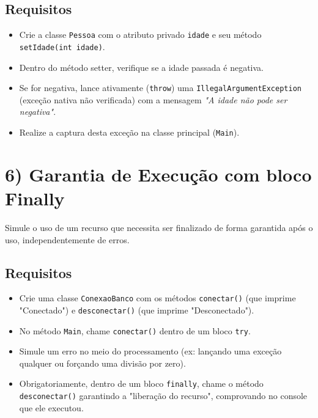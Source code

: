 \documentclass[12pt]{article}
\begin{document}
\subsection*{Requisitos}
\begin{itemize}
    \item Crie a classe \texttt{Pessoa} com o atributo privado \texttt{idade} e seu método \texttt{setIdade(int idade)}.
    \item Dentro do método setter, verifique se a idade passada é negativa.
    \item Se for negativa, lance ativamente (\texttt{throw}) uma \texttt{IllegalArgumentException} (exceção nativa não verificada) com a mensagem \textit{"A idade não pode ser negativa"}.
    \item Realize a captura desta exceção na classe principal (\texttt{Main}).
\end{itemize}

\section*{6) Garantia de Execução com bloco Finally}
Simule o uso de um recurso que necessita ser finalizado de forma garantida após o uso, independentemente de erros.

\begin{center}
\end{center}

\subsection*{Requisitos}
\begin{itemize}
    \item Crie uma classe \texttt{ConexaoBanco} com os métodos \texttt{conectar()} (que imprime "Conectado") e \texttt{desconectar()} (que imprime "Desconectado").
    \item No método \texttt{Main}, chame \texttt{conectar()} dentro de um bloco \texttt{try}.
    \item Simule um erro no meio do processamento (ex: lançando uma exceção qualquer ou forçando uma divisão por zero).
    \item Obrigatoriamente, dentro de um bloco \texttt{finally}, chame o método \texttt{desconectar()} garantindo a "liberação do recurso", comprovando no console que ele executou.
\end{itemize}
\end{document}
